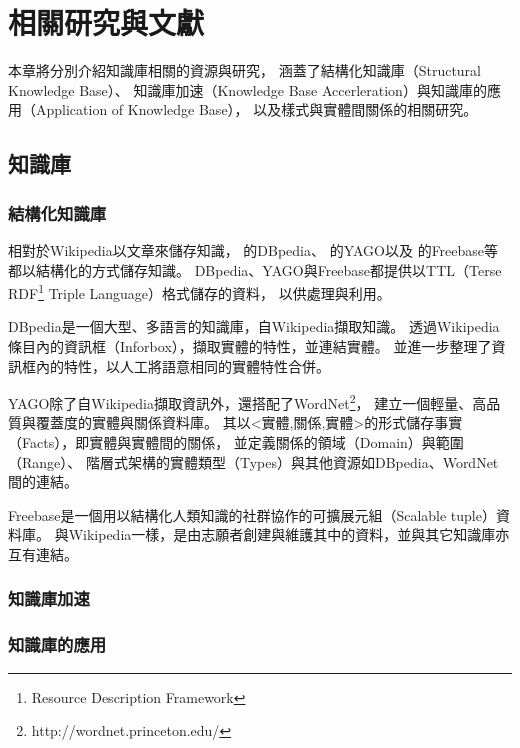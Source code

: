 %
%
%
\chapter{相關研究與文獻}
\label{c:related}

本章將分別介紹知識庫相關的資源與研究，
涵蓋了結構化知識庫（Structural Knowledge Base）、
知識庫加速（Knowledge Base Accerleration）與知識庫的應用（Application of Knowledge Base），
以及樣式與實體間關係的相關研究。

\section{知識庫}
\subsection{結構化知識庫}
相對於Wikipedia以文章來儲存知識，\cite{dbpedia} 的DBpedia、
\cite{yago} 的YAGO以及\cite{freebase} 的Freebase等都以結構化的方式儲存知識。
DBpedia、YAGO與Freebase都提供以TTL（Terse RDF\footnote{Resource Description Framework} Triple Language）格式儲存的資料，
以供處理與利用。

DBpedia是一個大型、多語言的知識庫，自Wikipedia擷取知識。
透過Wikipedia條目內的資訊框（Inforbox），擷取實體的特性，並連結實體。
並進一步整理了資訊框內的特性，以人工將語意相同的實體特性合併。

YAGO除了自Wikipedia擷取資訊外，還搭配了WordNet\footnote{http://wordnet.princeton.edu/}，
建立一個輕量、高品質與覆蓋度的實體與關係資料庫。
其以<實體,關係,實體>的形式儲存事實（Facts），即實體與實體間的關係，
並定義關係的領域（Domain）與範圍（Range）、
階層式架構的實體類型（Types）與其他資源如DBpedia、WordNet間的連結。

Freebase是一個用以結構化人類知識的社群協作的可擴展元組（Scalable tuple）資料庫。
與Wikipedia一樣，是由志願者創建與維護其中的資料，並與其它知識庫亦互有連結。

\subsection{知識庫加速}

\cite{kba2012,kba2013}

\subsection{知識庫的應用}
\cite{freebase-qa-extract}
\cite{freebase-qa-parse}
\cite{yago-qa}

